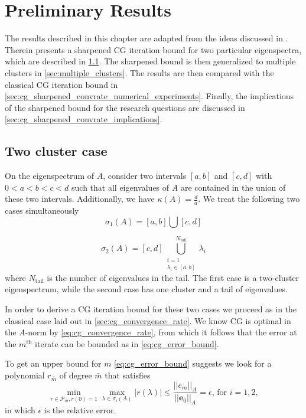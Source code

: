 \chapter{Preliminary Results}\label{ch:preliminary_results}
The results described in this chapter are adapted from the ideas discussed in \cite[Section 4]{cg_sharpened_convrate_Axelsson1976}. Therein \citeauthor{cg_sharpened_convrate_Axelsson1976} presents a sharpened CG iteration bound for two particular eigenspectra, which are described in \cref{sec:cg_sharpened_convrate}. The sharpened bound is then generalized to multiple clusters in \cref{sec:multiple_clusters}. The results are then compared with the classical CG iteration bound in \cref{sec:cg_sharpened_convrate_numerical_experiments}. Finally, the implications of the sharpened bound for the research questions are discussed in \cref{sec:cg_sharpened_convrate_implications}.

\section{Two cluster case}\label{sec:cg_sharpened_convrate}
On the eigenspectrum of $A$, consider two intervals $[a, b]$ and $[c, d]$ with $0 < a < b < c < d$ such that all eigenvalues of $A$ are contained in the union of these two intervals. Additionally, we have $\kappa(A) = \frac{d}{a}$. We treat the following two cases simultaneously
\begin{equation}
    \sigma_1(A) = [a,b] \bigcup [c,d]
    \label{eq:two_clusters}
\end{equation}

\begin{equation}
    \sigma_2(A) = [c,d] \bigcup_{\substack{i=1 \\ \lambda_i \in [a,b]}}^{N_{\text{tail}}} \lambda_i
    \label{eq:one_cluster_with_tail}
\end{equation}
where $N_{\text{tail}}$ is the number of eigenvalues in the tail. The first case is a two-cluster eigenspectrum, while the second case has one cluster and a tail of eigenvalues. 

In order to derive a CG iteration bound for these two cases we proceed as in the classical case laid out in \ref{sec:cg_convergence_rate}. We know CG is optimal in the $A$-norm by \cref{eq:cg_convergence_rate}, from which it follows that the error at the $m^{\text{th}}$ iterate can be bounded as in \cref{eq:cg_error_bound}.
 
To get an upper bound for $m$ \cref{eq:cg_error_bound} suggests we look for a polynomial $r_{\bar{m}}$ of degree $\bar{m}$ that satisfies
\[
    \min_{r \in \mathcal{P}_{\bar{m}}, r(0) = 1} \max_{\lambda \in \sigma_i(A)} |r(\lambda)| \leq \frac{||e_{m}||_A}{||\mathbf{e}_0||_A} = \epsilon \text{, for } i = 1,2, 
\]
in which $\epsilon$ is the relative error. 

